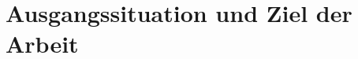 \documentclass[../main.tex]{subfiles}
\begin{document}
\section{Ausgangssituation und Ziel der Arbeit}
\end{document}
